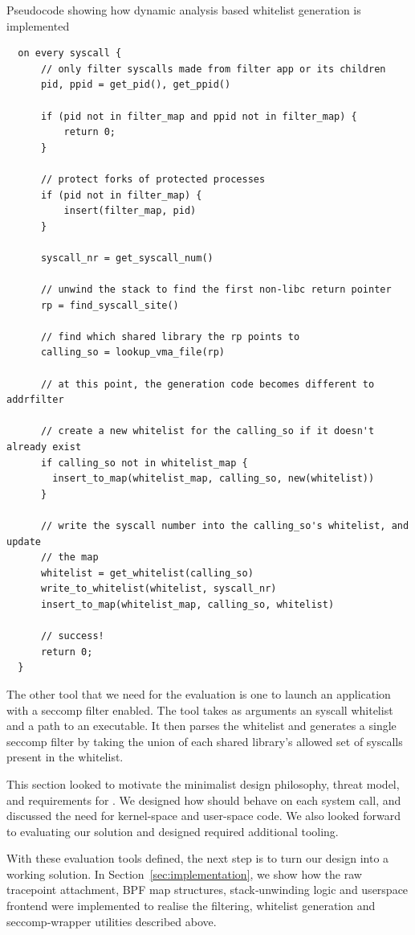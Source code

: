 \begin{listing}[ht]
  \caption{Pseudocode showing how dynamic analysis based whitelist generation is
  implemented}\label{lst:generator-pseudocode}
  \begin{verbatim}
  on every syscall {
      // only filter syscalls made from filter app or its children
      pid, ppid = get_pid(), get_ppid()

      if (pid not in filter_map and ppid not in filter_map) {
          return 0;
      }

      // protect forks of protected processes
      if (pid not in filter_map) {
          insert(filter_map, pid)
      }

      syscall_nr = get_syscall_num()

      // unwind the stack to find the first non-libc return pointer
      rp = find_syscall_site()

      // find which shared library the rp points to
      calling_so = lookup_vma_file(rp)

      // at this point, the generation code becomes different to addrfilter

      // create a new whitelist for the calling_so if it doesn't already exist
      if calling_so not in whitelist_map {
        insert_to_map(whitelist_map, calling_so, new(whitelist))
      }

      // write the syscall number into the calling_so's whitelist, and update
      // the map
      whitelist = get_whitelist(calling_so)
      write_to_whitelist(whitelist, syscall_nr)
      insert_to_map(whitelist_map, calling_so, whitelist)
        
      // success!
      return 0;
  }
  \end{verbatim}
\end{listing}

The other tool that we need for the evaluation is one to launch an application
with a seccomp filter enabled. The tool takes as arguments an \af syscall whitelist
and a path to an executable. It then parses the whitelist and generates a single
seccomp filter by taking the union of each shared library's allowed set of
syscalls present in the \af whitelist.

This section looked to motivate the minimalist design philosophy, threat model,
and requirements for \af. We designed how \af should behave on each system call,
and discussed the need for kernel-space and user-space code. We also looked
forward to evaluating our solution and designed required additional tooling.

With these evaluation tools defined, the next step is to turn our design into a
working solution. In Section \ref{sec:implementation}, we show how the raw 
tracepoint attachment, BPF map structures, stack‑unwinding logic and userspace 
frontend were implemented to realise the filtering, whitelist generation and 
seccomp‑wrapper utilities described above.
